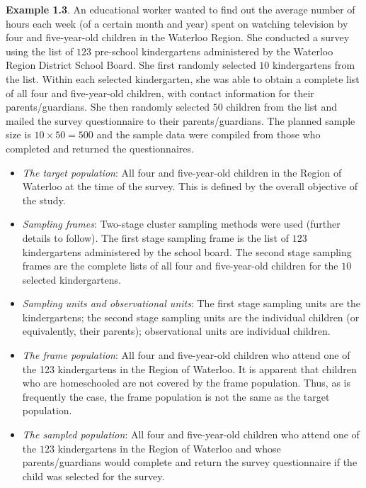 \documentclass[oneside]{book}\usepackage[]{graphicx}\usepackage[svgnames]{xcolor}
\begin{document}
\begin{Example}{}
      \textbf{Example 1.3}. An educational worker wanted to find out the average
      number of hours each week (of a certain month and year) spent on
      watching television by four and five-year-old children in the Waterloo
      Region. She conducted a survey using the list of $123$ pre-school
      kindergartens administered by the Waterloo Region District School
      Board. She first randomly selected $10$ kindergartens from the list.
      Within each selected kindergarten, she was able to obtain a complete
      list of all four and five-year-old children, with contact information for
      their parents/guardians. She then randomly selected $50$ children from
      the list and mailed the survey questionnaire to their parents/guardians.
      The planned sample size is $ 10\times 50=500 $ and the sample data were
      compiled from those who completed and returned the questionnaires.
      \begin{itemize}
            \item \emph{The target population}:
                  All four and five-year-old children in the Region of Waterloo at
                  the time of the survey. This is defined by the overall objective of
                  the study.
            \item \emph{Sampling frames}: Two-stage cluster sampling methods were used (further details to
                  follow). The first stage sampling frame is the list of $123$
                  kindergartens administered by the school board. The second
                  stage sampling frames are the complete lists of all four and five-year-old
                  children for the $10$ selected kindergartens.
            \item \emph{Sampling units and observational units}: The first stage sampling units are the kindergartens; the second
                  stage sampling units are the individual children (or equivalently,
                  their parents); observational units are individual children.
            \item \emph{The frame population}: All four and five-year-old children who attend one of the 123
                  kindergartens in the Region of Waterloo. It is apparent that
                  children who are homeschooled are not covered by the frame
                  population. Thus, as is frequently the case, the frame population
                  is not the same as the target population.
            \item \emph{The sampled population}: All four and
                  five-year-old children who attend one of the $123$
                  kindergartens in the Region of Waterloo and whose
                  parents/guardians would complete and return the survey
                  questionnaire if the child was selected for the survey.
      \end{itemize}
\end{Example}
\end{document}
